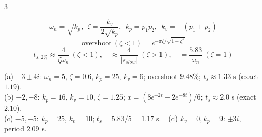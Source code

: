 \begin{multicols}{3}
\begin{fbx}
\[\omega_n=\sqrt{k_p},\ \ \zeta=\frac{k_v}{2\sqrt{k_p}},\ \ k_p=p_1p_2,\ \ k_v=-(p_1{+}p_2)\]
\[\text{overshoot}\ (\zeta{<}1)=e^{-\pi\zeta/\sqrt{1-\zeta^2}}\]
\[t_{s,2\%}\approx\frac4{\zeta\omega_n}\ (\zeta{<}1),\quad\approx\frac4{|s_{slow}|}\ (\zeta{>}1),\quad=\frac{5.83}{\omega_n}\ (\zeta{=}1)\]
\end{fbx}
\begin{worked}
(a) $-3\pm4i$: $\omega_n{=}5$, $\zeta{=}0.6$, $k_p{=}25$, $k_v{=}6$; overshoot $9.48\%$; $t_s\approx1.33$ s (exact $1.19$).\\
(b) $-2,-8$: $k_p{=}16$, $k_v{=}10$, $\zeta{=}1.25$; $x=(8e^{-2t}-2e^{-8t})/6$; $t_s\approx2.0$ s (exact $2.10$).\\
(c) $-5,-5$: $k_p{=}25$, $k_v{=}10$; $t_s=5.83/5=1.17$ s.\ \ (d) $k_v{=}0,k_p{=}9$: $\pm3i$, period $2.09$ s.
\end{worked}


\end{multicols}
